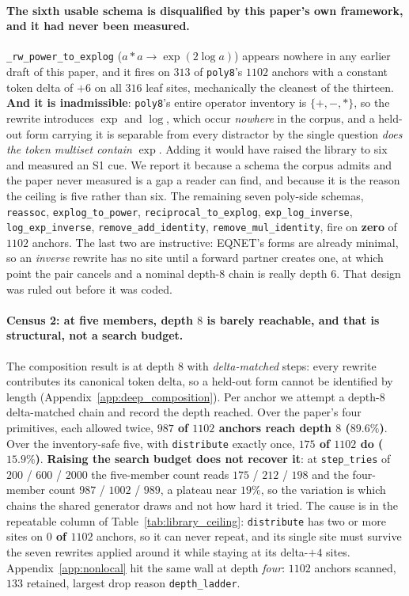 \paragraph{The sixth usable schema is disqualified by this paper's own framework, and it had never been measured.} \texttt{\_rw\_power\_to\_explog} ($a{*}a \to \exp(2\log a)$) appears nowhere in any earlier draft of this paper, and it fires on $313$ of \texttt{poly8}'s $1102$ anchors with a constant token delta of $+6$ on all $316$ leaf sites, mechanically the cleanest of the thirteen. \textbf{And it is inadmissible}: \texttt{poly8}'s entire operator inventory is $\{+,-,*\}$, so the rewrite introduces $\exp$ and $\log$, which occur \emph{nowhere} in the corpus, and a held-out form carrying it is separable from every distractor by the single question \emph{does the token multiset contain} $\exp$. Adding it would have raised the library to six and measured an S1 cue. We report it because a schema the corpus admits and the paper never measured is a gap a reader can find, and because it is the reason the ceiling is five rather than six. The remaining seven poly-side schemas, \texttt{reassoc}, \texttt{explog\_to\_power}, \texttt{reciprocal\_to\_explog}, \texttt{exp\_log\_inverse}, \texttt{log\_exp\_inverse}, \texttt{remove\_add\_identity}, \texttt{remove\_mul\_identity}, fire on \textbf{zero} of $1102$ anchors. The last two are instructive: EQNET's forms are already minimal, so an \emph{inverse} rewrite has no site until a forward partner creates one, at which point the pair cancels and a nominal depth-$8$ chain is really depth $6$. That design was ruled out before it was coded.

\paragraph{Census 2: at five members, depth $8$ is barely reachable, and that is structural, not a search budget.} The composition result is at depth $8$ with \emph{delta-matched} steps: every rewrite contributes its canonical token delta, so a held-out form cannot be identified by length (Appendix~\ref{app:deep_composition}). Per anchor we attempt a depth-$8$ delta-matched chain and record the depth reached. Over the paper's four primitives, each allowed twice, \textbf{$987$ of $1102$ anchors reach depth $8$ ($89.6\%$)}. Over the inventory-safe five, with \texttt{distribute} exactly once, \textbf{$175$ of $1102$ do ($15.9\%$)}. \textbf{Raising the search budget does not recover it}: at \texttt{step\_tries} of $200$ / $600$ / $2000$ the five-member count reads $175$ / $212$ / $198$ and the four-member count $987$ / $1002$ / $989$, a plateau near $19\%$, so the variation is which chains the shared generator draws and not how hard it tried. The cause is in the repeatable column of Table~\ref{tab:library_ceiling}: \texttt{distribute} has two or more sites on \textbf{$0$ of $1102$} anchors, so it can never repeat, and its single site must survive the seven rewrites applied around it while staying at its delta-$+4$ sites. Appendix~\ref{app:nonlocal} hit the same wall at depth \emph{four}: $1102$ anchors scanned, $133$ retained, largest drop reason \texttt{depth\_ladder}.

